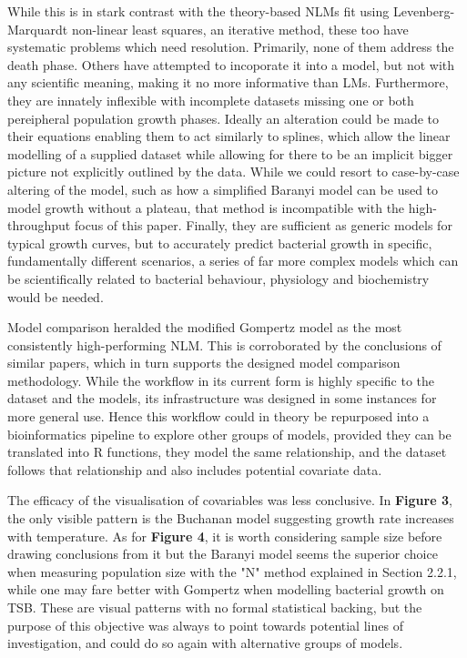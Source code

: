 \documentclass[11pt]{article}
\begin{document}
While this is in stark contrast with the theory-based NLMs fit using Levenberg-Marquardt non-linear least squares, an iterative method, these too have systematic problems which need resolution. Primarily, none of them address the death phase. Others have attempted to incoporate it into a model, but not with any scientific meaning, making it no more informative than LMs.\parencite{Peleg1997} Furthermore, they are innately inflexible with incomplete datasets missing one or both pereipheral population growth phases. Ideally an alteration could be made to their equations enabling them to act similarly to splines, which allow the linear modelling of a supplied dataset while allowing for there to be an implicit bigger picture not explicitly outlined by the data. While we could resort to case-by-case altering of the model, such as how a simplified Baranyi model can be used to model growth without a plateau, that method is incompatible with the high-throughput focus of this paper.\parencite{Baranyi1993} Finally, they are sufficient as generic models for typical growth curves, but to accurately predict bacterial growth in specific, fundamentally different scenarios, a series of far more complex models which can be scientifically related to bacterial behaviour, physiology and biochemistry would be needed. 

Model comparison heralded the modified Gompertz model as the most consistently high-performing NLM. This is corroborated by the conclusions of similar papers, which in turn supports the designed model comparison methodology.\parencite{Zwietering1990,Buchanan1997} While the workflow in its current form is highly specific to the dataset and the models, its infrastructure was designed in some instances for more general use. Hence this workflow could in theory be repurposed into a bioinformatics pipeline to explore other groups of models, provided they can be translated into R functions, they model the same relationship, and the dataset follows that relationship and also includes potential covariate data.

The efficacy of the visualisation of covariables was less conclusive. In \textbf{Figure 3}, the only visible pattern is the Buchanan model suggesting growth rate increases with temperature. As for \textbf{Figure 4}, it is worth considering sample size before drawing conclusions from it but the Baranyi model seems the superior choice when measuring population size with the "N" method explained in Section 2.2.1, while one may fare better with Gompertz when modelling bacterial growth on TSB. These are visual patterns with no formal statistical backing, but the purpose of this objective was always to point towards potential lines of investigation, and could do so again with alternative groups of models.
\end{document}
